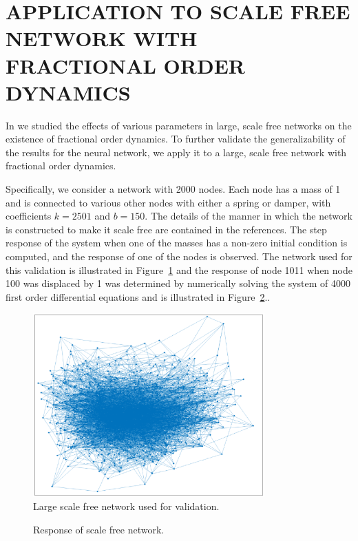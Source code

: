 \section{APPLICATION TO SCALE FREE NETWORK WITH FRACTIONAL ORDER DYNAMICS}
\label{sec:scalefree}

In \cite{goodwinemed2023,goodwinemmar2023} we studied the effects of various
parameters in large, scale free networks on the existence of fractional order
dynamics. To further validate the generalizability of the results for the neural
network, we apply it to a large, scale free network with fractional order
dynamics.

Specifically, we consider a network with 2000 nodes. Each node has a mass of 1
and is connected to various other nodes with either a spring or damper, with
coefficients $k = 2501$ and $b = 150$. The details of the manner in which the
network is constructed to make it scale free are contained in the references.
The step response of the system when one of the masses has a non-zero initial
condition is computed, and the response of one of the nodes is observed. The
network used for this validation is illustrated in Figure~\ref{fig:network} and
the response of node 1011 when node 100 was displaced by 1 was determined by
numerically solving the system of 4000 first order differential equations and is
illustrated in Figure~\ref{fig:sfresp}..

\begin{figure}
\centering
\includegraphics[width=3.5in]{network}
\caption{Large scale free network used for validation.}
\label{fig:network}
\end{figure}

\begin{figure}
\centering

\vspace*{-5pt}
\caption{Response of scale free network.}
\label{fig:sfresp}
\end{figure}

